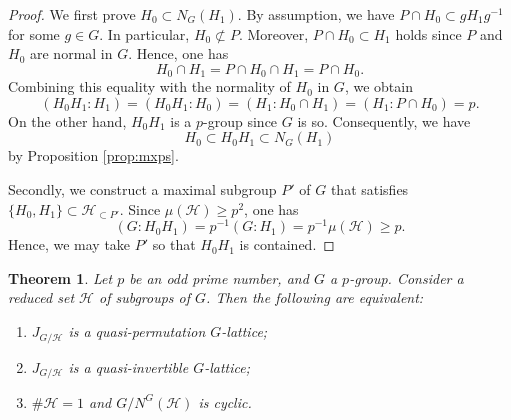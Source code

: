 \documentclass[12pt]{amsart}
\theoremstyle{plain}
\newtheorem{thm}{Theorem}[section]
\theoremstyle{definition}
\numberwithin{thm}{section}
\numberwithin{equation}{section}
\newcommand{\cH}{\mathcal{H}}
\begin{document}
\begin{proof}
We first prove $H_{0}\subset N_{G}(H_{1})$. By assumption, we have $P\cap H_{0}\subset gH_{1}g^{-1}$ for some $g\in G$. In particular, $H_{0}\not\subset P$. Moreover, $P\cap H_{0}\subset H_{1}$ holds since $P$ and $H_{0}$ are normal in $G$. Hence, one has
\begin{equation*}
H_{0}\cap H_{1}=P\cap H_{0}\cap H_{1}=P\cap H_{0}. 
\end{equation*}
Combining this equality with the normality of $H_{0}$ in $G$, we obtain
\begin{equation*}
(H_{0}H_{1}:H_{1})=(H_{0}H_{1}:H_{0})=(H_{1}:H_{0}\cap H_{1})=(H_{1}:P\cap H_{0})=p. 
\end{equation*}
On the other hand, $H_{0}H_{1}$ is a $p$-group since $G$ is so. Consequently, we have 
\begin{equation*}
H_{0}\subset H_{0}H_{1}\subset N_{G}(H_{1})
\end{equation*}
by Proposition \ref{prop:mxps}. 

Secondly, we construct a maximal subgroup $P'$ of $G$ that satisfies $\{H_{0},H_{1}\}\subset \cH_{\subset P'}$. Since $\mu(\cH)\geq p^{2}$, one has
\begin{equation*}
    (G:H_{0}H_{1})=p^{-1}(G:H_{1})=p^{-1}\mu(\cH)\geq p. 
\end{equation*}
Hence, we may take $P'$ so that $H_{0}H_{1}$ is contained. 
\end{proof}

\begin{thm}\label{thm:ndqp}
Let $p$ be an odd prime number, and $G$ a $p$-group. Consider a reduced set $\cH$ of subgroups of $G$. Then the following are equivalent: 
\begin{enumerate}
    \item $J_{G/\cH}$ is a quasi-permutation $G$-lattice; 
    \item $J_{G/\cH}$ is a quasi-invertible $G$-lattice; 
    \item $\#\cH=1$ and $G/N^{G}(\cH)$ is cyclic. 
\end{enumerate}
\end{thm}
\end{document}
